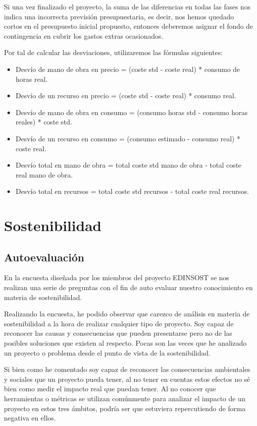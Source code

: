 \documentclass[titlepage,12pt]{report}
\begin{document}
Si una vez finalizado el proyecto, la suma de las diferencias en todas las fases nos indica una incorrecta previsión presupuestaria, es decir, nos hemos quedado cortos en el presupuesto inicial propuesto, entonces deberemos asignar el fondo de contingencia en cubrir los gastos extras ocasionados.

Por tal de calcular las desviaciones, utilizaremos las fórmulas siguientes:

\begin{itemize}

	\item Desvío de mano de obra en precio = (coste std - coste real) * consumo de horas real.
	\item Desvío de un recurso en precio = (coste std - coste real) * consumo real.
	\item Desvío de mano de obra en consumo = (consumo horas std - consumo horas reales) * coste std.
	\item Desvío de un recurso en consumo = (consumo estimado - consumo real) * coste real.
	\item Desvío total en mano de obra = total coste std mano de obra - total coste real mano de obra.
	\item Desvío total en recursos = total coste std recursos - total coste real recursos.

\end{itemize}

\section{Sostenibilidad}

\subsection{Autoevaluación}

En la encuesta diseñada por los miembros del proyecto EDINSOST se nos realizan una serie de preguntas con el fin de auto evaluar nuestro conocimiento en materia de sostenibilidad.

Realizando la encuesta, he podido observar que carezco de análisis en materia de sostenibilidad a la hora de realizar cualquier tipo de proyecto. Soy capaz de reconocer las causas y consecuencias que pueden presentarse pero no de las posibles soluciones que existen al respecto. Pocas son las veces que he analizado un proyecto o problema desde el punto de vista de la sostenibilidad.

Si bien como he comentado soy capaz de reconocer las consecuencias ambientales y sociales que un proyecto pueda tener, al no tener en cuentas estos efectos no sé bien como medir el impacto real que puedan tener. Al no conocer que herramientas o métricas se utilizan comúnmente para analizar el impacto de un proyecto en estos tres ámbitos, podría ser que estuviera repercutiendo de forma negativa en ellos.
\end{document}
